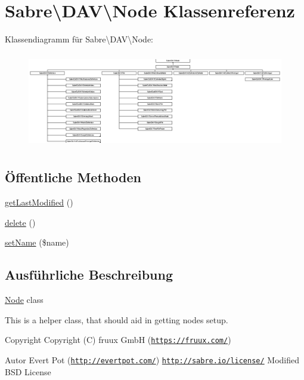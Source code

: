 \hypertarget{class_sabre_1_1_d_a_v_1_1_node}{}\section{Sabre\textbackslash{}D\+AV\textbackslash{}Node Klassenreferenz}
\label{class_sabre_1_1_d_a_v_1_1_node}
Klassendiagramm für Sabre\textbackslash{}D\+AV\textbackslash{}Node\+:\begin{figure}[H]
\begin{center}
\leavevmode
\includegraphics[height=4.194757cm]{class_sabre_1_1_d_a_v_1_1_node}
\end{center}
\end{figure}
\subsection*{Öffentliche Methoden}
\begin{DoxyCompactItemize}
\item 
\mbox{\hyperlink{class_sabre_1_1_d_a_v_1_1_node_a270cf8a08ed3cf7a0db7db34d3aa2327}{get\+Last\+Modified}} ()
\item 
\mbox{\hyperlink{class_sabre_1_1_d_a_v_1_1_node_aab3dca6fc9d878b38b4af9d097bd09d1}{delete}} ()
\item 
\mbox{\hyperlink{class_sabre_1_1_d_a_v_1_1_node_a1d029db9c2900104c89d1493ffa9199d}{set\+Name}} (\$name)
\end{DoxyCompactItemize}


\subsection{Ausführliche Beschreibung}
\mbox{\hyperlink{class_sabre_1_1_d_a_v_1_1_node}{Node}} class

This is a helper class, that should aid in getting nodes setup.

\begin{DoxyCopyright}{Copyright}
Copyright (C) fruux GmbH (\href{https://fruux.com/}{\tt https\+://fruux.\+com/}) 
\end{DoxyCopyright}
\begin{DoxyAuthor}{Autor}
Evert Pot (\href{http://evertpot.com/}{\tt http\+://evertpot.\+com/})  \href{http://sabre.io/license/}{\tt http\+://sabre.\+io/license/} Modified B\+SD License 
\end{DoxyAuthor}


